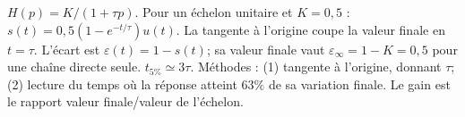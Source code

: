 \begin{corrigebox}
$H(p)=K/(1+\tau p)$.
Pour un échelon unitaire et $K=0,5$ :
            $s(t)=0,5(1-e^{-t/\tau})u(t)$. La tangente à l'origine coupe la valeur finale
            en $t=\tau$.
L'écart est $\varepsilon(t)=1-s(t)$; sa valeur finale vaut
            $\varepsilon_\infty=1-K=0,5$ pour une chaîne directe seule.
$t_{5\%}\simeq3\tau$.
Méthodes : (1) tangente à l'origine, donnant $\tau$; (2) lecture du temps
            où la réponse atteint $63\%$ de sa variation finale. Le gain est le rapport
            valeur finale/valeur de l'échelon.
\end{corrigebox}
